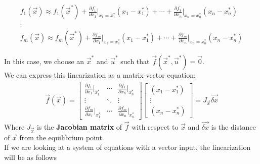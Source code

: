 \begin{center}
    \begin{align*}
        f_1(\vec{x}) \approx f_1(\vec{x}^*) + \frac{\partial f_1}{\partial x_1} \bigg\rvert_{x_1 = x_1^*} (x_1 - x_1^*) + \cdots + \frac{\partial f_1}{\partial x_n} \bigg\rvert_{x_n = x_n^*} (x_n - x_n^*) \\
        \vdots \\
        f_m(\vec{x}) \approx f_m(\vec{x}^*) + \frac{\partial f_m}{\partial x_1} \bigg\rvert_{x_1 = x_1^*} (x_1 - x_1^*) + \cdots + \frac{\partial f_m}{\partial x_n} \bigg\rvert_{x_n = x_n^*} (x_n - x_n^*)
    \end{align*}
\end{center}
In this case, we choose an $\vec{x}^*$ and $\vec{u}^*$ such that $\vec{f}(\vec{x}^*, \vec{u}^*) = \vec{0}$. \\
\newline
We can express this linearization as a matrix-vector equation:
\begin{align*}
    \vec{f}(\vec{x}) = \begin{bmatrix}
        \frac{\partial f_1}{\partial x_1} \bigg\rvert_{x_1^*} & \cdots & \frac{\partial f_1}{\partial x_n} \bigg\rvert_{x_n^*} \\
        \vdots & \ddots & \vdots \\
        \frac{\partial f_m}{\partial x_1} \bigg\rvert_{x_1^*} & \cdots & \frac{\partial f_m}{\partial x_n} \bigg\rvert_{x_n^*}
    \end{bmatrix} \begin{bmatrix}
        (x_1 - x_1^*) \\
        \vdots \\
        (x_n - x_n^*)
    \end{bmatrix} = J_{\vec{x}} \vec{\delta x}
\end{align*}
Where $J_{\vec{x}}$ is the \textbf{Jacobian matrix} of $\vec{f}$ with respect to $\vec{x}$ and $\vec{\delta x}$ is the distance of $\vec{x}$ from the equilibrium point. \\
\newline
If we are looking at a system of equations with a vector input, the linearization will be as follows
